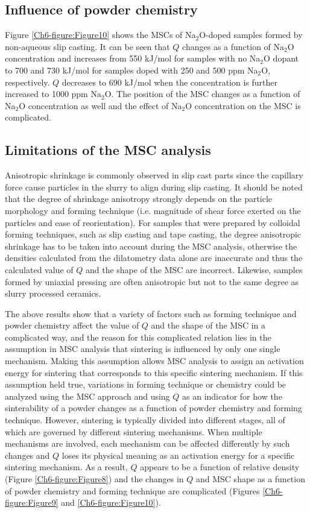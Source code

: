 \subsection{Influence of powder chemistry}

Figure \ref{Ch6-figure:Figure10} shows the MSCs of Na$_{2}$O-doped samples formed by non-aqueous slip casting. It can be seen that $Q$ changes as a function of Na$_{2}$O concentration and increases from 550 kJ/mol for samples with no Na$_{2}$O dopant to 700 and 730 kJ/mol for samples doped with 250 and 500 ppm Na$_{2}$O, respectively. $Q$ decreases to 690 kJ/mol when the concentration is further increased to 1000 ppm Na$_{2}$O. The position of the MSC changes as a function of Na$_{2}$O concentration as well and the effect of Na$_{2}$O concentration on the MSC is complicated.

\subsection{Limitations of the MSC analysis}

Anisotropic shrinkage is commonly observed in slip cast parts since the capillary force cause particles in the slurry to align during slip casting. It should be noted that the degree of shrinkage anisotropy strongly depends on the particle morphology and forming technique (i.e. magnitude of shear force exerted on the particles and ease of reorientation). For samples that were prepared by colloidal forming techniques, such as slip casting and tape casting, the degree anisotropic shrinkage has to be taken into account during the MSC analysis, otherwise the densities calculated from the dilatometry data alone are inaccurate and thus the calculated value of $Q$ and the shape of the MSC are incorrect. Likewise, samples formed by uniaxial pressing are often anisotropic but not to the same degree as slurry processed ceramics.

The above results show that a variety of factors such as forming technique and powder chemistry affect the value of $Q$ and the shape of the MSC in a complicated way, and the reason for this complicated relation lies in the assumption in MSC analysis that sintering is influenced by only one single mechanism. Making this assumption allows MSC analysis to assign an activation energy for sintering that corresponds to this specific sintering mechanism. If this assumption held true, variations in forming technique or chemistry could be analyzed using the MSC approach and using $Q$ as an indicator for how the sinterability of a powder changes as a function of powder chemistry and forming technique. However, sintering is typically divided into different stages, all of which are governed by different sintering mechanisms. When multiple mechanisms are involved, each mechanism can be affected differently by such changes and $Q$ loses its physical meaning as an activation energy for a specific sintering mechanism. As a result, $Q$ appears to be a function of relative density (Figure \ref{Ch6-figure:Figure8}) and the changes in $Q$ and MSC shape as a function of powder chemistry and forming technique are complicated (Figures \ref{Ch6-figure:Figure9} and \ref{Ch6-figure:Figure10}). 

